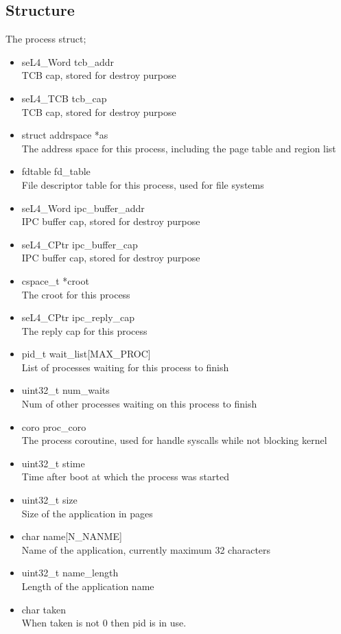\documentclass[12pt]{article}
\begin{document}
\subsection{Structure}
The process struct;
\begin{itemize}
\item seL4\_Word tcb\_addr\\
TCB cap, stored for destroy purpose
\item seL4\_TCB tcb\_cap\\
TCB cap, stored for destroy purpose
\item struct addrspace *as\\
The address space for this process, including the page table and region list
\item fdtable fd\_table\\
File descriptor table for this process, used for file systems
\item seL4\_Word ipc\_buffer\_addr\\
IPC buffer cap, stored for destroy purpose
\item seL4\_CPtr ipc\_buffer\_cap\\
IPC buffer cap, stored for destroy purpose
\item cspace\_t *croot\\
The croot for this process
\item seL4\_CPtr ipc\_reply\_cap\\
The reply cap for this process
\item pid\_t wait\_list[MAX\_PROC]\\
List of processes waiting for this process to finish
\item uint32\_t num\_waits\\
Num of other processes waiting on this process to finish
\item coro proc\_coro\\
The process coroutine, used for handle syscalls while not blocking kernel
\item uint32\_t stime\\
Time after boot at which the process was started
\item uint32\_t size\\
Size of the application in pages
\item char name[N\_NANME]\\
Name of the application, currently maximum 32 characters
\item uint32\_t name\_length\\
Length of the application name
\item char taken\\
When taken is not 0 then pid is in use.
\end{itemize}
\end{document}
